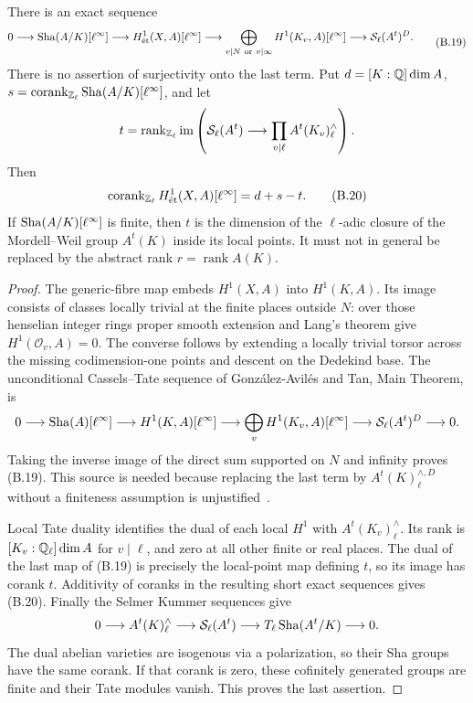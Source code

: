 \begin{theorem}\label{thm:B-Sha-corank}
There is an exact sequence
\[
\begin{split}
0\longrightarrow\mathop{\mathrm{Sha}}(A/K)[\ell^\infty]
\longrightarrow H^1_{\mathrm{\acute et}}(X,A)[\ell^\infty]
\longrightarrow\bigoplus_{v\mid N\ \mathrm{or}\ v\mid\infty}
 H^1(K_v,A)[\ell^\infty]
\longrightarrow\mathcal S_\ell(A^t)^D .
\end{split}\tag{B.19}
\]
There is no assertion of surjectivity onto the last term.
Put \(d=[K:\mathbb Q]\dim A\),
\(s=\operatorname{corank}_{\mathbb Z_\ell}\mathop{\mathrm{Sha}}(A/K)[\ell^\infty]\), and let
\[
 t=\operatorname{rank}_{\mathbb Z_\ell}\operatorname{im}
 \left(\mathcal S_\ell(A^t)\longrightarrow
 \prod_{v\mid\ell}A^t(K_v)^{\wedge}_\ell\right).
\]
Then
\[
 \operatorname{corank}_{\mathbb Z_\ell}H^1_{\mathrm{\acute et}}(X,A)[\ell^\infty]=d+s-t.
 \tag{B.20}
\]
If \(\mathop{\mathrm{Sha}}(A/K)[\ell^\infty]\) is finite, then \(t\) is the
dimension of the \(\ell\)-adic closure of the Mordell--Weil group
\(A^t(K)\) inside its local points.  It must not in general be
replaced by the abstract rank \(r=\operatorname{rank}A(K)\).
\end{theorem}
\begin{proof}
The generic-fibre map embeds \(H^1(X,A)\) into \(H^1(K,A)\).
Its image consists of classes locally trivial at the finite places
outside \(N\): over those henselian integer rings proper smooth
extension and Lang's theorem give \(H^1(\mathcal O_v,A)=0\).
The converse follows by extending a locally trivial torsor across the
missing codimension-one points and descent on the Dedekind base.
The unconditional Cassels--Tate sequence of Gonz\'alez-Avil\'es and
Tan, Main Theorem, is
\[
0\longrightarrow\mathop{\mathrm{Sha}}(A)[\ell^\infty]\longrightarrow H^1(K,A)[\ell^\infty]
\longrightarrow\bigoplus_v H^1(K_v,A)[\ell^\infty]
\longrightarrow\mathcal S_\ell(A^t)^D\longrightarrow0.
\]
Taking the inverse image of the direct sum supported on \(N\) and
infinity proves (B.19).  This source is needed because replacing
the last term by \(A^t(K)^{\wedge,D}_\ell\) without a finiteness
assumption is unjustified~\cite[Main Theorem and equation~(6)]{BGonzalezTan2007}.

Local Tate duality identifies the dual of each local \(H^1\) with
\(A^t(K_v)^{\wedge}_\ell\).  Its rank is
\([K_v:\mathbb Q_\ell]\dim A\) for \(v\mid\ell\), and zero at all
other finite or real places.  The dual of the last map of (B.19)
is precisely the local-point map defining \(t\), so its image has
corank \(t\).  Additivity of coranks in the resulting short exact
sequences gives (B.20).  Finally the Selmer Kummer sequences give
\[
0\longrightarrow A^t(K)^{\wedge}_\ell
\longrightarrow\mathcal S_\ell(A^t)
\longrightarrow T_\ell\mathop{\mathrm{Sha}}(A^t/K)\longrightarrow0.
\]
The dual abelian varieties are isogenous via a polarization, so their
Sha groups have the same corank.  If that corank is zero, these
cofinitely generated groups are finite and their Tate modules vanish.
This proves the last assertion.
\end{proof}

